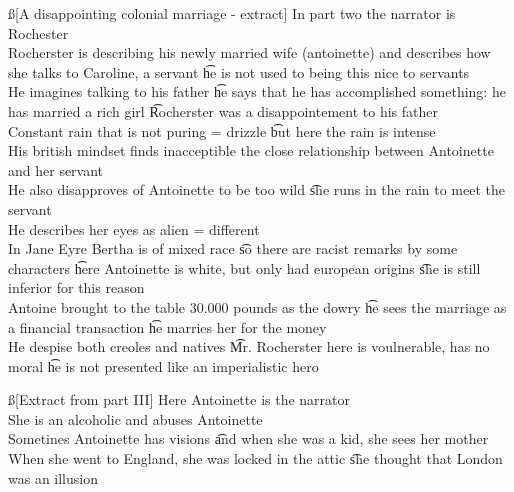 \documentclass[12pt]{article}
\begin{document}
\ss[A disappointing colonial marriage - extract]
In part two the narrator is Rochester \\
Rocherster is describing his newly married wife (antoinette) and describes how she talks to Caroline, a servant \t he is not used to being this nice to servants \\
He imagines talking to his father \t he says that he has accomplished something: he has married a rich girl \t Rocherster was a disappointement to his father \\
Constant rain that is not puring = drizzle \t but here the rain is intense \\
His british mindset finds inacceptible the close relationship between Antoinette and her servant \\
He also disapproves of Antoinette to be too wild \t she runs in the rain to meet the servant \\
He describes her eyes as alien = different \\
In Jane Eyre Bertha is of mixed race \t so there are racist remarks by some characters \t here Antoinette is white, but only had european origins \t she is still inferior for this reason \\
Antoine brought to the table 30.000 pounds as the dowry \t he sees the marriage as a financial transaction \t he marries her for the money \\
He despise both creoles and natives \t Mr. Rocherster here is voulnerable, has no moral \t he is not presented like an imperialistic hero

\ss[Extract from part III]
Here Antoinette is the narrator \\
She is an alcoholic and abuses Antoinette \\
Sometines Antoinette has visions \t and when she was a kid, she sees her mother \\
When she went to England, she was locked in the attic \t she thought that London was an illusion
\end{document}
